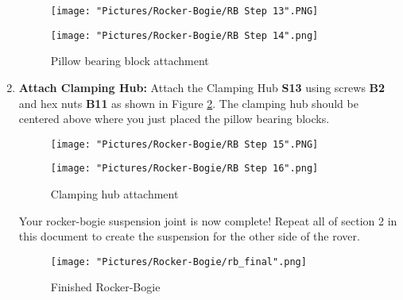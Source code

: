 \documentclass[12pt]{article}
\begin{document}
\begin{enumerate}
\begin{figure}[H]
  \centering
  \begin{minipage}[b]{0.45\textwidth}
    \texttt{[image: "Pictures/Rocker-Bogie/RB Step 13".PNG]}
  \end{minipage}
  \hfill
  \begin{minipage}[b]{0.45\textwidth}
    \texttt{[image: "Pictures/Rocker-Bogie/RB Step 14".png]}
  \end{minipage}
  \caption{Pillow bearing block attachment}
  \label{pillow bearing block}
\end{figure}

\item \textbf{Attach Clamping Hub:} Attach the Clamping Hub \textbf{S13} using screws \textbf{B2} and hex nuts \textbf{B11} as shown in Figure \ref{clamping hub}. The clamping hub should be centered above where you just placed the pillow bearing blocks.

\begin{figure}[H]
  \centering
  \begin{minipage}[b]{0.45\textwidth}
    \texttt{[image: "Pictures/Rocker-Bogie/RB Step 15".PNG]}
  \end{minipage}
  \hfill
  \begin{minipage}[b]{0.45\textwidth}
    \texttt{[image: "Pictures/Rocker-Bogie/RB Step 16".png]}
  \end{minipage}
  \caption{Clamping hub attachment}
  \label{clamping hub}
\end{figure}

Your rocker-bogie suspension joint is now complete!  Repeat all of section 2 in this document to create the suspension for the other side of the rover.

\begin{figure}[H]
	\centering
	\texttt{[image: "Pictures/Rocker-Bogie/rb\_final".png]}
	\caption{Finished Rocker-Bogie}
	\label{rb final}
\end{figure}

\end{enumerate}
\end{document}
